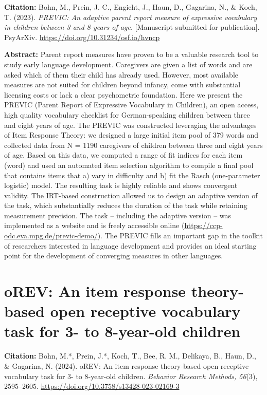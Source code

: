 \documentclass[
]{scrbook}
\begin{document}
\textbf{Citation:} Bohn, M., Prein, J. C., Engicht, J., Haun, D., Gagarina, N., \& Koch, T. (2023). \emph{PREVIC: An adaptive parent report measure of expressive vocabulary in children between 3 and 8 years of age.} {[}Manuscript submitted for publication{]}. PsyArXiv. \mbox{\url{https://doi.org/10.31234/osf.io/hvncp}}

\textbf{Abstract:} Parent report measures have proven to be a valuable research tool to study early language development. Caregivers are given a list of words and are asked which of them their child has already used. However, most available measures are not suited for children beyond infancy, come with substantial licensing costs or lack a clear psychometric foundation. Here we present the PREVIC (Parent Report of Expressive Vocabulary in Children), an open access, high quality vocabulary checklist for German-speaking children between three and eight years of age. The PREVIC was constructed leveraging the advantages of Item Response Theory: we designed a large initial item pool of 379 words and collected data from N = 1190 caregivers of children between three and eight years of age. Based on this data, we computed a range of fit indices for each item (word) and used an automated item selection algorithm to compile a final pool that contains items that a) vary in difficulty and b) fit the Rasch (one-parameter logistic) model. The resulting task is highly reliable and shows convergent validity. The IRT-based construction allowed us to design an adaptive version of the task, which substantially reduces the duration of the task while retaining measurement precision. The task -- including the adaptive version -- was implemented as a website and is freely accessible online (\mbox{\url{https://ccp-odc.eva.mpg.de/previc-demo/}}). The PREVIC fills an important gap in the toolkit of researchers interested in language development and provides an ideal starting point for the development of converging measures in other languages.

\newpage

\section*{oREV: An item response theory-based open receptive vocabulary task for 3- to 8-year-old children}\label{orev}

\textbf{Citation:} Bohn, M.*, Prein, J.*, Koch, T., Bee, R. M., Delikaya, B., Haun, D., \& Gagarina, N. (2024). oREV: An item response theory-based open receptive vocabulary task for 3- to 8-year-old children. \emph{Behavior Research Methods, 56}(3), 2595--2605. \mbox{\url{https://doi.org/10.3758/s13428-023-02169-3}}
\end{document}
